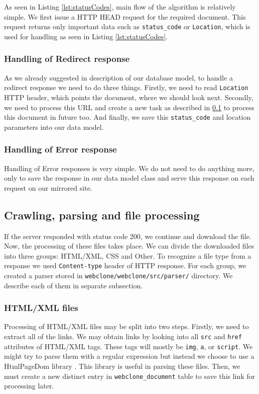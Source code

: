 As seen in Listing \ref{lst:statusCodes}, main flow of the algorithm is relatively simple. We first issue a HTTP HEAD request for the required document. This request returns only important data such as \texttt{status\_code} or \texttt{Location}, which is used for handling as seen in Listing \ref{lst:statusCodes}.

\subsubsection{Handling of Redirect response}
As we already suggested in description of our database model, to handle a redirect response we need to do three things. Firstly, we need to read \texttt{Location} HTTP header, which points the document, where we should look next. Secondly, we need to process this URL and create a new task as described in \ref{sec:crawling} to process this document in future too. And finally, we save this \texttt{status\_code} and location parameters into our data model.


\subsubsection{Handling of Error response}
Handling of Error responses is very simple. We do not need to do anything more, only to save the response in our data model class and serve this response on each request on our mirrored site. 


\subsection{Crawling, parsing and file processing}
\label{sec:crawling}
If the server responded with status code 200, we continue and download the file. Now, the processing of these files takes place. We can divide the downloaded files into three groups: HTML/XML, CSS and Other. To recognize a file type from a response we used \texttt{Content-type} header of HTTP response. For each group, we created a parser stored in \texttt{webclone/webclone/src/parser/} directory. We describe each of them in separate subsection.


\subsubsection{HTML/XML files}
Processing of HTML/XML files may be split into two steps.
Firstly, we need to extract all of the links. We may obtain links by looking into all \texttt{src} and \texttt{href} attributes of HTML/XML tags. These tags will mostly be \texttt{img}, \texttt{a}, or \texttt{script}. We might try to parse them with a regular expression but instead we choose to use a HtmlPageDom library \cite{htmlpagedom}. This library is useful in parsing these files. Then, we must create a new distinct entry in \texttt{webclone\_document} table to save this link for processing later.

